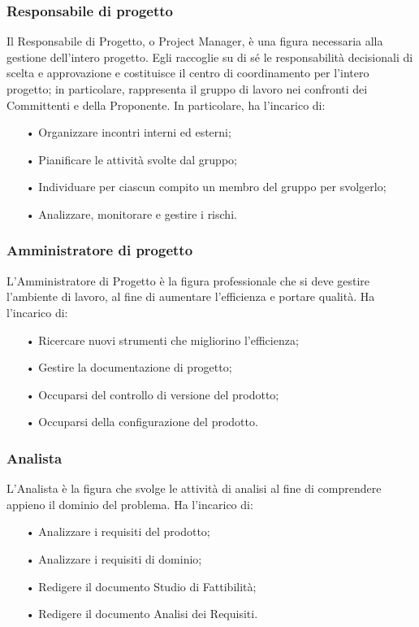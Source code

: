 \subsubsection{Responsabile di progetto}
Il Responsabile di Progetto, o Project Manager, è una figura necessaria alla gestione dell’intero progetto. Egli raccoglie su di sé le responsabilità decisionali di scelta e approvazione e costituisce il centro di coordinamento per l'intero progetto; in particolare, rappresenta il gruppo di lavoro nei confronti dei Committenti e della Proponente. 
\newline
In particolare, ha l’incarico di:
\begin{itemize}
\item[•] Organizzare incontri interni ed esterni;
\item[•] Pianificare le attività svolte dal gruppo;
\item[•] Individuare per ciascun compito un membro del gruppo per svolgerlo;
\item[•] Analizzare, monitorare e gestire i rischi.
\end{itemize}

\subsubsection{Amministratore di progetto}
L’Amministratore di Progetto è la figura professionale che si deve gestire l’ambiente di lavoro, al fine di aumentare l’efficienza e portare qualità. 
\newline
Ha l'incarico di:
\begin{itemize}
\item[•] Ricercare nuovi strumenti che migliorino l’efficienza;
\item[•] Gestire la documentazione di progetto;
\item[•] Occuparsi del controllo di versione del prodotto;
\item[•] Occuparsi della configurazione del prodotto.
\end{itemize}

\subsubsection{Analista}
L'Analista è la figura che svolge le attività di analisi al fine di comprendere appieno il dominio del problema.  
\newline
Ha l’incarico di:
\begin{itemize}
\item[•] Analizzare i requisiti del prodotto;
\item[•] Analizzare i requisiti di dominio;
\item[•] Redigere il documento Studio di Fattibilità;
\item[•] Redigere il documento Analisi dei Requisiti.
\end{itemize}

